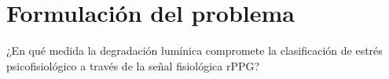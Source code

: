 \begin{itemize}
    

    


\end{itemize}

\section{Formulación del problema}
¿En qué medida la degradación lumínica compromete la clasificación de estrés psicofisiológico
a través de la señal fisiológica rPPG?


